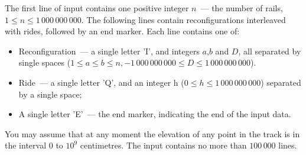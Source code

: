 The first line of input contains one positive integer $n$~--- the number of rails, $1 \le n \le 1\,000\,000\,000$. The
following lines contain reconfigurations interleaved with rides, followed by an end marker. Each line contains
one of:

\begin{itemize}
\item Reconfiguration~--- a single letter 'I', and integers $a$,$b$ and $D$, all separated by single spaces ($1 \le a \le b \le n, -1\,000\,000\,000 \le D \le 1\,000\,000\,000$).

\item Ride~--- a single letter 'Q', and an integer h ($0 \le h \le 1\,000\,000\,000$) separated by a single space;

\item A single letter 'E'~--- the end marker, indicating the end of the input data.
\end{itemize}

You may assume that at any moment the elevation of any point in the track is in the interval $0$ to $10^9$ centimetres. The input contains no more than $100\,000$ lines.
